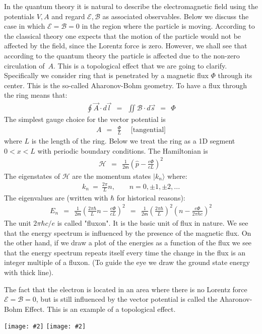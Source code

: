 \documentclass[onecolumn,fleqn]{revtex4}
\newcommand{\mass}{\mathsf{m}}
\newcommand{\putgraph}[2][0.30\hsize]{\texttt{[image: \#2]}}
\newcommand{\beq}{\begin{eqnarray}}
\newcommand{\eeq}{\end{eqnarray}}
\begin{document}
In the quantum theory it is natural to describe the electromagnetic 
field using the potentials ${V,A}$ and regard ${\mathcal{E},\mathcal{B}}$ 
as associated observables. Below we discuss the case 
in which ${\mathcal{E}= \mathcal{B}=0}$ in the region where 
the particle is moving. According to the classical theory 
one expects that the motion of the particle would not 
be affected by the field, since the Lorentz force is zero. 
However, we shall see that according to the quantum theory 
the particle is affected due to the non-zero circulation of~${A}$. 
This is a topological effect that we are going to clarify. 
Specifically we consider ring that is penetrated by a magnetic 
flux ${\Phi}$ through its center. This is the so-called Aharonov-Bohm 
geometry. To have a flux through the ring means that:
\beq
\oint \vec{A} \cdot d\vec{l} \ \ = \ \ \iint \mathcal{B} \cdot d\vec{s} \ \ = \ \ \Phi 
\eeq
The simplest gauge choice for the vector potential is  
\beq
A \ \ = \ \ \frac{\Phi}{L}  \ \ \ \ \  \ \mbox{[tangential]}
\eeq
where $L$ is the length of the ring. 
Below we treat the ring as a 1D segment ${0<x<L}$ 
with periodic boundary conditions. 
The Hamiltonian is 
\beq
\mathcal{H} \ \ = \ \ \frac {1}{2\mass}\left(\hat{p}-\frac{e\Phi}{cL}\right)^2 
\eeq
The eigenstates of $\mathcal{H}$ 
are the momentum states ${|k_n \rangle}$ where:
\beq
k_n \ = \ \frac {2\pi }{L} n, 
\ \ \ \ \ \ \ \ \ n=0,\pm1,\pm2,...
\eeq
The eigenvalues are (written with $\hbar$ for historical reasons):
\beq
E_n \ \ = \ \ \frac{1}{2\mass}\left(\frac{2\pi\hbar}{L}n-\frac{e\Phi}{cL}\right)^2
\ \ = \ \ \frac{1}{2\mass}\left(\frac {2\pi\hbar}{L}\right)^2 \left(n-\frac{e\Phi}{2\pi\hbar c}\right)^2 
\eeq
The unit ${{2\pi \hbar c}/{e}}$ is called "fluxon". It is the basic unit of flux in nature. 
We see that the energy spectrum is influenced by the presence of the magnetic flux. 
On the other hand, if we draw a plot of the energies as a function of the flux 
we see that the energy spectrum repeats itself every time the change in the flux is 
an integer multiple of a fluxon. (To guide the eye we draw the ground state energy with thick line). 

The fact that the electron is located in an area where there is no Lorentz 
force ${\mathcal{E}= \mathcal{B}=0}$, but is still influenced by 
the vector potential is called the Aharonov-Bohm Effect. 
This is an example of a topological effect. 


\begin{center}
\putgraph[0.2\hsize]{RingWithFlux} 
\hspace*{0.2\hsize}
\putgraph[0.4\hsize]{RingWithFluxEnergySpectrum}
\end{center}
\end{document}
